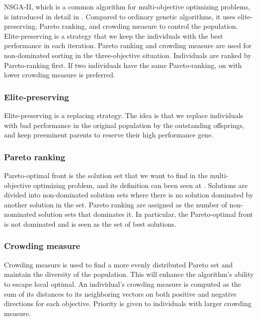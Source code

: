 \documentclass[conference]{IEEEtran}
\begin{document}
   NSGA-II, which is a common algorithm for multi-objective optimizing problems, is introduced in detail in \cite{996017}. Compared to ordinary genetic algorithms, it uses elite-preserving, Pareto ranking, and crowding measure to control the population. Elite-preserving is a strategy that we keep the individuals with the best performance in each iteration. Pareto ranking and crowding measure are used for non-dominated sorting in the three-objective situation. Individuals are ranked by Pareto-ranking first. If two individuals have the same Pareto-ranking, on with lower crowding measure is preferred.
   
	 \subsubsection{Elite-preserving}
	 
	 Elite-preserving is a replacing strategy. The idea is that we replace individuals with bad performance in the original population by the outstanding offsprings, and keep preeminent parents to reserve their high performance gene. 
	 
	 \subsubsection{Pareto ranking}
	 
   Pareto-optimal front is the solution set that we want to find in the multi-objective optimizing problem, and its definition can been seen at \cite{ishibuchi2007analysis}. Solutions are divided into  non-dominated solution sets where there is no solution dominated by another solution in the set. Pareto ranking are assigned as the number of non-nominated solution sets that dominates it. In particular, the Pareto-optimal front is not dominated and is seen as the set of best solutions.
	 
	 \subsubsection{Crowding measure}
	 
	 Crowding measure is used to find a more evenly distributed Pareto set and maintain the diversity of the population. This will enhance the algorithm's ability to escape local optimal. An individual's crowding measure is computed as the sum of its distances to its neighboring vectors on both positive and negative directions for each objective. Priority is given to individuals with larger crowding measure.
	 
\end{document}
